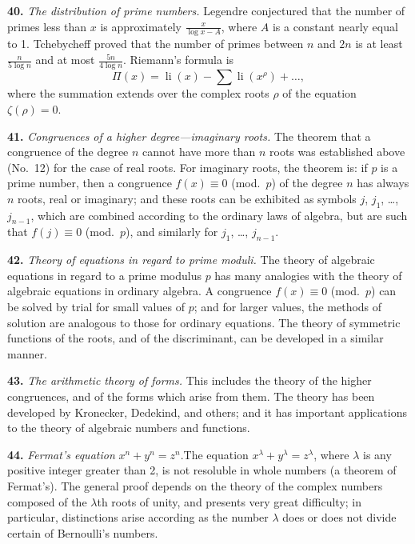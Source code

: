 \documentclass[11pt,a4paper]{article}
\begin{document}
\textbf{40.}\quad
\textit{The distribution of prime numbers.} Legendre conjectured that the number of primes less than $x$ is approximately $\frac{x}{\log x - A}$, where $A$ is a constant nearly equal to 1. Tchebycheff proved that the number of primes between $n$ and $2n$ is at least $\frac{n}{5\log n}$ and at most $\frac{5n}{4\log n}$. Riemann's formula is
\[
\Pi(x) = \operatorname{li}(x) - \sum \operatorname{li}(x^{\rho}) + \ldots,
\]
where the summation extends over the complex roots $\rho$ of the equation $\zeta(\rho) = 0$.

\textbf{41.}\quad
\textit{Congruences of a higher degree---imaginary roots.} The theorem that a congruence of the degree $n$ cannot have more than $n$ roots was established above (No.~12) for the case of real roots. For imaginary roots, the theorem is: if $p$ is a prime number, then a congruence $f(x) \equiv 0$ (mod.\ $p$) of the degree $n$ has always $n$ roots, real or imaginary; and these roots can be exhibited as symbols $j$, $j_{1}$, \ldots, $j_{n-1}$, which are combined according to the ordinary laws of algebra, but are such that $f(j) \equiv 0$ (mod.\ $p$), and similarly for $j_{1}$, \ldots, $j_{n-1}$.

\textbf{42.}\quad
\textit{Theory of equations in regard to prime moduli.} The theory of algebraic equations in regard to a prime modulus $p$ has many analogies with the theory of algebraic equations in ordinary algebra. A congruence $f(x) \equiv 0$ (mod.\ $p$) can be solved by trial for small values of $p$; and for larger values, the methods of solution are analogous to those for ordinary equations. The theory of symmetric functions of the roots, and of the discriminant, can be developed in a similar manner.

\textbf{43.}\quad
\textit{The arithmetic theory of forms.} This includes the theory of the higher congruences, and of the forms which arise from them. The theory has been developed by Kronecker, Dedekind, and others; and it has important applications to the theory of algebraic numbers and functions.

\textbf{44.}\quad
\textit{Fermat's equation} $x^{n} + y^{n} = z^{n}$.\quad The equation $x^{\lambda} + y^{\lambda} = z^{\lambda}$, where $\lambda$ is any positive integer greater than 2, is not resoluble in whole numbers (a theorem of Fermat's). The general proof depends on the theory of the complex numbers composed of the $\lambda$th roots of unity, and presents very great difficulty; in particular, distinctions arise according as the number $\lambda$ does or does not divide certain of Bernoulli's numbers.
\end{document}
